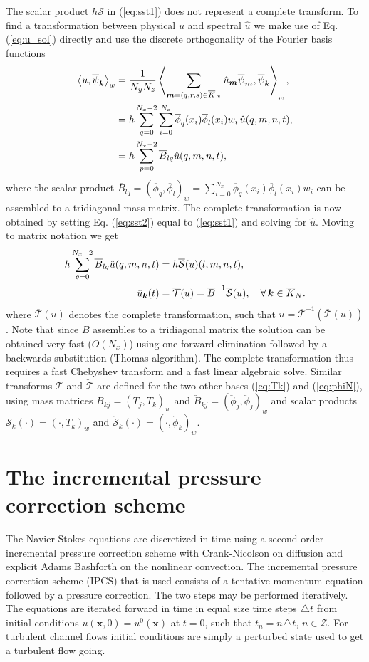 \documentclass[11pt, oneside]{article}
\newcommand{\N}[1]{\check{#1}}
\newcommand{\D}[1]{\overline{#1}}
\begin{document}
The scalar product  $h\D{\mathcal{S}}$ in (\ref{eq:sst1}) does not represent a complete transform. To find a transformation between physical $u$ and spectral $\hat{u}$ we make use of Eq. (\ref{eq:u_sol}) directly and use the discrete orthogonality of the Fourier basis functions
\begin{align}
\left<u, \D{\psi}_{\bm{k}}\right>_w &= \frac{1}{N_yN_z}\left< \sum_{\bm{m}=(q,r,s) \in \D{K}_N} \hat{u}_{\bm{m}} \D{\psi}_{\bm{m}}, \D{\psi}_{\bm{k}} \right>_w, \notag \\
           &= h \sum_{q=0}^{N_x-2} \sum_{i=0}^{N_x} \D{\phi}_{q}(x_i) \D{\phi}_{l}(x_i) w_i \, \hat{u}(q, {m}, {n}, t), \notag \\
           &= h \sum_{p=0}^{N_x-2} \D{B}_{lq} \hat{u}(q, {m}, {n}, t), \label{eq:sst2}
\end{align}
where the scalar product $\D{B}_{lq} = (\D{\phi}_q, \D{\phi}_l)_w = \sum_{i=0}^{N_x} \D{\phi}_{q}(x_i) \D{\phi}_{l}(x_i) w_i$ can be assembled to a tridiagonal mass matrix. The complete transformation is now obtained by setting Eq. (\ref{eq:sst2}) equal to (\ref{eq:sst1}) and solving for $\hat{u}$. Moving to matrix notation we get
\begin{align}
h\sum_{q=0}^{N_x-2} \D{B}_{lq} \hat{u}(q, {m}, {n}, t) &= h\D{\mathcal{S}}(u)(l, m, n, t), \notag \\
 \hat{u}_{\bm{k}}(t) &= \D{\mathcal{T}}(u) =  \D{B}^{-1}\D{\mathcal{S}}(u), \quad \forall \, \bm{k} \in \D{K}_N.
\end{align}
where $\D{\mathcal{T}}(u)$ denotes the complete transformation, such that $u = \D{\mathcal{T}}^{-1}(\D{\mathcal{T}}(u))$. Note that since $\D{B}$ assembles to a tridiagonal matrix the solution can be obtained very fast ($O(N_x)$) using one forward elimination followed by a backwards substitution (Thomas algorithm). The complete transformation thus requires a fast Chebyshev transform and a fast linear algebraic solve. Similar transforms $\mathcal{T}$ and $\N{\mathcal{T}}$ are defined for the two other bases (\ref{eq:Tk}) and (\ref{eq:phiN}), using mass matrices $B_{kj}=(T_j, T_k)_w$ and $\N{B}_{kj}=(\N{\phi}_j, \N{\phi}_j)_w$ and scalar products $\mathcal{S}_k(\cdot) = (\cdot, T_k)_w$ and $\N{\mathcal{S}}_k(\cdot) = (\cdot, \N{\phi}_k)_w$.


\section{The incremental pressure correction scheme}

The Navier Stokes equations are discretized in time using a second order incremental pressure correction scheme with Crank-Nicolson on diffusion and explicit Adams Bashforth on the nonlinear convection. The incremental pressure correction scheme (IPCS) that is used consists of a tentative momentum equation followed by a pressure correction. The two steps may be performed iteratively. The equations are iterated forward in time in equal size time steps $\triangle t$ from initial conditions $u(\bm{x}, 0) = u^0(\bm{x})$ at $t=0$, such that $t_n = n\triangle t$, $n \in \mathcal{Z}$. For turbulent channel flows initial conditions are simply a perturbed state used to get a turbulent flow going. 
\end{document}
